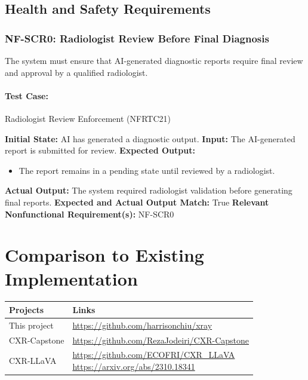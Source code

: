 \documentclass[12pt, titlepage]{article}
\begin{document}
\subsection{Health and Safety Requirements}

\subsubsection{NF-SCR0: Radiologist Review Before Final Diagnosis}
The system must ensure that AI-generated diagnostic reports require final review and approval by a qualified radiologist.

\paragraph{Test Case:} Radiologist Review Enforcement (NFRTC21)

\textbf{Initial State:} AI has generated a diagnostic output.  
\textbf{Input:} The AI-generated report is submitted for review.  
\textbf{Expected Output:}
\begin{itemize}
    \item The report remains in a pending state until reviewed by a radiologist.
\end{itemize}
\textbf{Actual Output:} The system required radiologist validation before generating final reports.  
\textbf{Expected and Actual Output Match:} True  
\textbf{Relevant Nonfunctional Requirement(s):} NF-SCR0  


	
\section{Comparison to Existing Implementation}	

\begin{table}[]
  \centering
  \begin{tabular}{|l|l|}
  \hline
  \textbf{Projects} & \textbf{Links} \\ \hline
  This project & \url{https://github.com/harrisonchiu/xray} \\ \hline
  CXR-Capstone & \url{https://github.com/RezaJodeiri/CXR-Capstone} \\ \hline
  CXR-LLaVA & 
  \makecell{\url{https://github.com/ECOFRI/CXR\_LLaVA} \\ \url{https://arxiv.org/abs/2310.18341}} \\ \hline
  \end{tabular}
\end{table}
\end{document}
